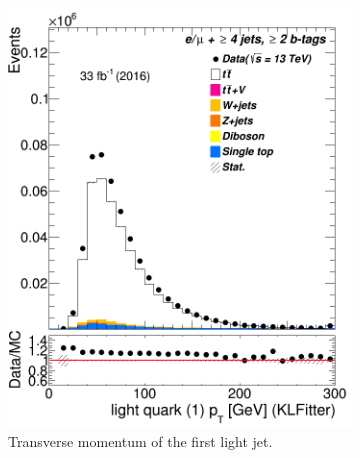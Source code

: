 \begin{figure}
\begin{subfigure}{0.25\textwidth}
	\includegraphics[width=\linewidth]{ControlPlots_emujets_2016_4incl_2incl/klf_lq1_pt_emujets_2016.png}
	\caption{Transverse momentum of the first light jet.} \label{fig:K39}
\end{subfigure}	
\hspace*{0.5cm}
		\begin{subfigure}{0.25\textwidth}

\end{subfigure}
\end{figure}
